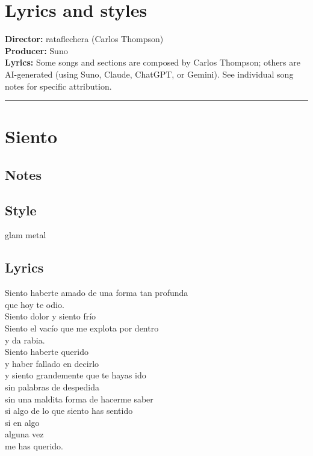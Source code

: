 \documentclass[]{article}
\author{}
\date{}
\begin{document}
\section{Lyrics and styles}\label{lyrics-and-styles}

\textbf{Director:} rataflechera (Carlos Thompson)\\
\textbf{Producer:} Suno\\
\textbf{Lyrics:} Some songs and sections are composed by Carlos
Thompson; others are AI-generated (using Suno, Claude, ChatGPT, or
Gemini). See individual song notes for specific attribution.

\begin{center}\rule{0.5\linewidth}{0.5pt}\end{center}

\section{Siento}\label{siento}

\subsection{Notes}\label{notes}

\subsection{Style}\label{style}

glam metal

\subsection{Lyrics}\label{lyrics}

Siento haberte amado de una forma tan profunda\\
que hoy te odio.\\
Siento dolor y siento frío\\
Siento el vacío que me explota por dentro\\
y da rabia.\\
Siento haberte querido\\
y haber fallado en decirlo\\
y siento grandemente que te hayas ido\\
sin palabras de despedida\\
sin una maldita forma de hacerme saber\\
si algo de lo que siento has sentido\\
si en algo\\
alguna vez\\
me has querido.
\end{document}

